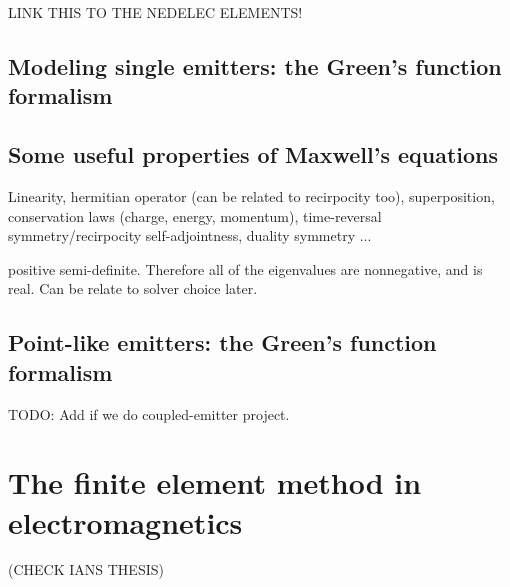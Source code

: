  LINK THIS TO THE NEDELEC ELEMENTS!

\subsection*{Modeling single emitters: the Green's function formalism}

\subsection*{Some useful properties of Maxwell's equations}

Linearity, hermitian operator (can be related to recirpocity too), superposition, 
conservation laws (charge, energy, momentum), time-reversal symmetry/recirpocity
self-adjointness, duality symmetry ...

positive semi-definite. Therefore all of the eigenvalues are nonnegative, and is real. Can
be relate to solver choice later.

\subsection*{Point-like emitters: the Green's function formalism}

TODO: Add if we do coupled-emitter project.

\section{The finite element method in electromagnetics}

(CHECK IANS THESIS)

